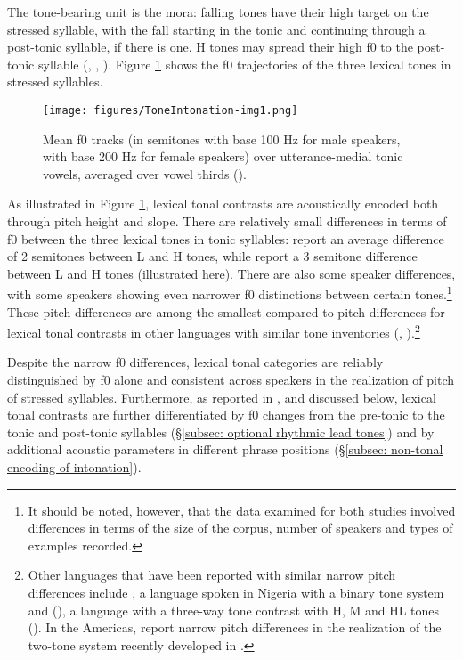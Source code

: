The tone-bearing unit is the mora: falling tones have their high target on the stressed syllable, with the fall starting in the tonic and continuing through a post-tonic syllable, if there is one. H tones may spread their high f0 to the post-tonic syllable (\citealt{caballero2015tone}, \citealt{garellek2015lexical}, \citealt{kubuzono2020raramuri}). Figure \ref{fig: lexical tone f0 trajectories} shows the f0 trajectories of the three lexical tones in stressed syllables.

\begin{figure}
\texttt{[image: figures/ToneIntonation-img1.png]}
\caption{
\label{fig: lexical tone f0 trajectories}
Mean f0 tracks (in semitones with base 100 Hz for male speakers, with base 200 Hz for female speakers) over utterance-medial tonic vowels, averaged over vowel thirds (\citealt{kubuzono2020raramuri}). }
\end{figure}

As illustrated in Figure \ref{fig: lexical tone f0 trajectories}, lexical tonal contrasts are acoustically encoded both through pitch height and slope. There are relatively small differences in terms of f0 between the three lexical tones in tonic syllables: \citet{caballero2015tone} report an average difference of 2 semitones between L and H tones, while \citet{kubuzono2020raramuri} report a 3 semitone difference between L and H tones (illustrated here). There are also some speaker differences, with some speakers showing even narrower f0 distinctions between certain tones.\footnote{It should be noted, however, that the data examined for both studies involved differences in terms of the size of the corpus, number of speakers and types of examples recorded.} These pitch differences are among the smallest compared to pitch differences for lexical tonal contrasts in other languages with similar tone inventories (\citealt{alexander2010theory}, \citealt{silva2006acoustic}).\footnote{ Other languages that have been reported with similar narrow pitch differences include , a  language spoken in Nigeria with a binary tone system and  (), a language with a three-way tone contrast with H, M and HL tones (\citealt{maddieson1979tone}). In the Americas, \citet{guion2010word} report narrow pitch differences in the realization of the two-tone system recently developed in .}

Despite the narrow f0 differences, lexical tonal categories are reliably distinguished by f0 alone and consistent across speakers in the realization of pitch of stressed syllables. Furthermore, as reported in \citet{garellek2015lexical}, \citet{kubuzono2020raramuri} and discussed below, lexical tonal contrasts are further differentiated by f0 changes from the pre-tonic to the tonic and post-tonic syllables (§\ref{subsec: optional rhythmic lead tones}) and by additional acoustic parameters in different phrase positions (§\ref{subsec: non-tonal encoding of intonation}).

